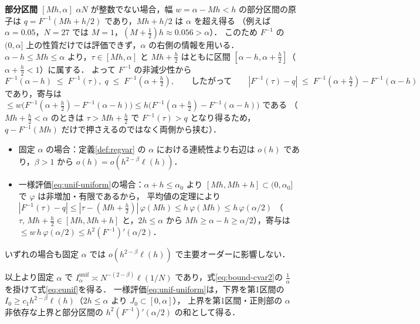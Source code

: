 \documentclass[a4paper,10pt]{jsarticle}
\makeatletter
\theoremstyle{definition}
\renewenvironment{proof}[1][\proofname]{\par
  \pushQED{\qed}%
  \normalfont \topsep6\p@\@plus6\p@\relax
  \trivlist
  \item[\hskip\labelsep\textbf{#1}]\ignorespaces
}{%
  \popQED\endtrivlist\@endpefalse
}
\renewcommand{\proofname}{証明}
\newcommand{\Finv}{F^{-1}}
\newcommand{\Iunif}{I_\alpha^{\mathrm{unif}}}
\makeatother
\begin{document}
\begin{proof}
\noindent\textbf{部分区間 $[Mh,\alpha]$}
$\alpha N$ が整数でない場合，幅 $w=\alpha-Mh<h$ の部分区間の原子は $q=\Finv(Mh+h/2)$ であり，$Mh+h/2$ は $\alpha$ を超え得る
（例えば $\alpha=0.05$，$N=27$ では $M=1$，$(M+\frac12)h\approx0.056>\alpha$）．
このため $\Finv$ の $(0,\alpha]$ 上の性質だけでは評価できず，$\alpha$ の右側の情報を用いる．
$\alpha-h\le Mh\le\alpha$ より，$\tau\in[Mh,\alpha]$ と $Mh+\frac h2$ はともに区間 $[\alpha-h,\alpha+\frac h2]$（$\alpha+\frac h2<1$）に属する．
よって $\Finv$ の非減少性から
\begin{equation*}
 \Finv(\alpha-h)\;\le\;\Finv(\tau),\;q\;\le\;\Finv(\alpha+\tfrac h2),
 \qquad\text{したがって}\qquad
 |\Finv(\tau)-q|\;\le\;\Finv(\alpha+\tfrac h2)-\Finv(\alpha-h)
\end{equation*}
であり，寄与は $\le w\bigl(\Finv(\alpha+\frac h2)-\Finv(\alpha-h)\bigr)\le h\bigl(\Finv(\alpha+\frac h2)-\Finv(\alpha-h)\bigr)$ である
（$Mh+\frac h2<\alpha$ のときは $\tau>Mh+\frac h2$ で $\Finv(\tau)>q$ となり得るため，$q-\Finv(Mh)$ だけで押さえるのではなく両側から挟む）．
\begin{itemize}
\item 固定 $\alpha$ の場合：定義\ref{def:regvar} の $\alpha$ における連続性より右辺は $o(h)$ であり，$\beta>1$ から $o(h)=o(h^{2-\beta}\ell(h))$．
\item 一様評価\eqref{eq:unif-uniform}の場合：$\alpha+h\le\alpha_0$ より $[Mh,Mh+h]\subset(0,\alpha_0]$ で $\varphi$ は非増加・有限であるから，
 平均値の定理により $|\Finv(\tau)-q|\le|\tau-(Mh+\tfrac h2)|\,\varphi(Mh)\le h\,\varphi(Mh)\le h\,\varphi(\alpha/2)$
 （$\tau,\,Mh+\frac h2\in[Mh,Mh+h]$ と，$2h\le\alpha$ から $Mh\ge\alpha-h\ge\alpha/2$），寄与は $\le w\,h\,\varphi(\alpha/2)\le h^2(\Finv)'(\alpha/2)$．
\end{itemize}
いずれの場合も固定 $\alpha$ では $o(h^{2-\beta}\ell(h))$ で主要オーダーに影響しない．

以上より固定 $\alpha$ で $\Iunif\asymp N^{-(2-\beta)}\ell(1/N)$ であり，式\eqref{eq:bound-cvar2}の $\frac1\alpha$ を掛けて式\eqref{eq:eunif}を得る．
一様評価\eqref{eq:unif-uniform}は，下界を第1区間の $I_0\ge c_1h^{2-\beta}\ell(h)$（$2h\le\alpha$ より $J_0\subset[0,\alpha]$），
上界を第1区間・正則部の $\alpha$ 非依存な上界と部分区間の $h^2(\Finv)'(\alpha/2)$ の和として得る．
\end{proof}
\end{document}
